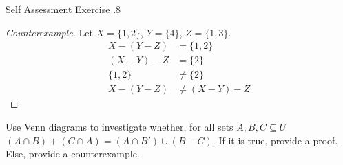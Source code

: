 \documentclass[\main/notes.tex]{subfiles}
\begin{document}
\begin{exercise}{Self Assessment Exercise \thechapter.8}
\begin{questions}
\begin{answer}
\begin{center}
\begin{vennthree}[labelA=$X$, labelB=$Y$, labelC=$Z$, tikzoptions={scale=0.8}][$Y - Z$]
								\fillBNotC
							\end{vennthree}
							\begin{vennthree}[labelA=$X$, labelB=$Y$, labelC=$Z$, tikzoptions={scale=0.8}][$X - (Y - Z)$]
								\fillOnlyA
								\fillACapC
							\end{vennthree}
							\begin{vennthree}[labelA=$X$, labelB=$Y$, labelC=$Z$, tikzoptions={scale=0.8}][$X - Y$]
								\fillANotB
							\end{vennthree}
							\begin{vennthree}[labelA=$X$, labelB=$Y$, labelC=$Z$, tikzoptions={scale=0.8}][$Z$]
								\fillC
							\end{vennthree}
							\begin{vennthree}[labelA=$X$, labelB=$Y$, labelC=$Z$, tikzoptions={scale=0.8}][$(X - Y) - Z$]
								\fillOnlyA
							\end{vennthree}
						\end{center}
						\begin{proof}[Counterexample]
							Let $X = \{1, 2\}$, $Y = \{4\}$, $Z = \{1, 3\}$.
								\begin{align*}
									X - (Y - Z) &= \{1, 2\}\\
									(X - Y) - Z &= \{2\}\\
									\{1, 2\} &\neq \{2\}\\
									X - (Y - Z) &\neq (X - Y) - Z
								\end{align*}
						\end{proof}
					\end{answer}
				\pagebreak
				\item Use Venn diagrams to investigate whether, for all sets $A, B, C \subseteq U$ \\
				$(A \cap B) + (C \cap A) = (A \cap B') \cup (B - C)$. If it is true, provide a proof. Else, provide a counterexample.
					\begin{answer}
						\begin{center}
							\begin{vennthree}[tikzoptions={scale=0.8}][$A \cap B$]
								\fillACapB
							\end{vennthree}
							\begin{vennthree}[tikzoptions={scale=0.8}][$C \cap A$]
								\fillACapC
							\end{vennthree}
							\begin{vennthree}[tikzoptions={scale=0.8}][$(A \cap B) + (C \cap A)$]
								\fillACapBNotC
								\fillACapCNotB

\end{vennthree}
\end{center}
\end{answer}
\end{questions}
\end{exercise}
\end{document}
